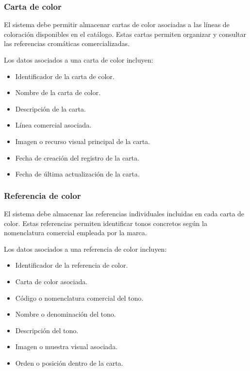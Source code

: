 \subsubsection*{Carta de color}

El sistema debe permitir almacenar cartas de color asociadas a las líneas de coloración disponibles en el catálogo. Estas cartas permiten organizar y consultar las referencias cromáticas comercializadas.

Los datos asociados a una carta de color incluyen:

\begin{itemize}
    \item Identificador de la carta de color.
    \item Nombre de la carta de color.
    \item Descripción de la carta.
    \item Línea comercial asociada.
    \item Imagen o recurso visual principal de la carta.
    \item Fecha de creación del registro de la carta.
    \item Fecha de última actualización de la carta.
\end{itemize}

\subsubsection*{Referencia de color}

El sistema debe almacenar las referencias individuales incluidas en cada carta de color. Estas referencias permiten identificar tonos concretos según la nomenclatura comercial empleada por la marca.

Los datos asociados a una referencia de color incluyen:

\begin{itemize}
    \item Identificador de la referencia de color.
    \item Carta de color asociada.
    \item Código o nomenclatura comercial del tono.
    \item Nombre o denominación del tono.
    \item Descripción del tono.
    \item Imagen o muestra visual asociada.
    \item Orden o posición dentro de la carta.
\end{itemize}

